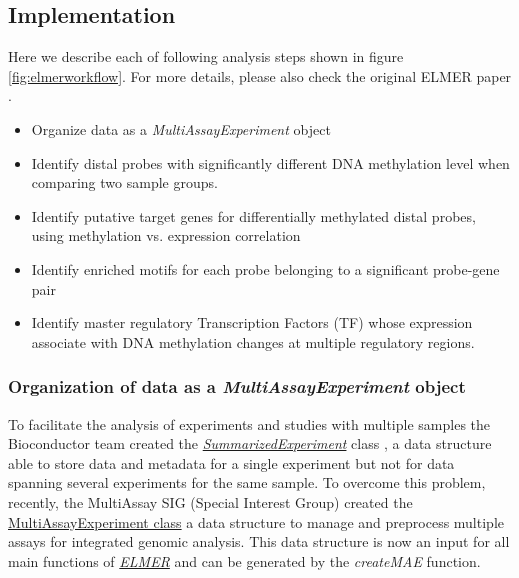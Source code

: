 \subsection{Implementation}

Here we describe each of following analysis steps shown in figure \ref{fig:elmerworkflow}. For more details, please also check the original ELMER paper \cite{yao2015inferring}. 
\begin{itemize}
    \item Organize data as a \textit{MultiAssayExperiment} object
	\item Identify distal probes with significantly different DNA methylation level when comparing two sample groups.
	\item Identify putative target genes for differentially methylated distal probes, using methylation vs. expression correlation
	\item Identify enriched motifs for each probe belonging to a significant probe-gene pair
	\item Identify master regulatory Transcription Factors (TF) whose expression associate with DNA methylation changes at multiple regulatory regions.
\end{itemize}




\subsubsection{Organization of data as a \textit{MultiAssayExperiment} object}

To facilitate the analysis of experiments and studies with multiple samples the Bioconductor team created the \href{http://bioconductor.org/packages/SummarizedExperiment/}{\textit{SummarizedExperiment}} class \cite{huber2015orchestrating}, a data structure able to store data and metadata for a single experiment but not for data spanning several experiments for the same sample. To overcome this problem, recently, the MultiAssay SIG (Special Interest Group) created the \href{http://bioconductor.org/packages/MultiAssayExperiment/}{MultiAssayExperiment class} \cite{mae2017} a data structure to manage and preprocess multiple assays for integrated genomic analysis. This data structure is now an input for all main functions of \href{https://github.com/tiagochst/ELMER}{\textit{ELMER}} and can be generated by the \textit{createMAE} function. 


